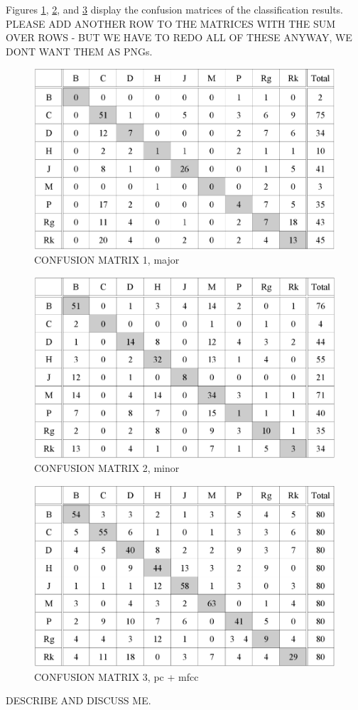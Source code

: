\documentclass{article}
\begin{document}
Figures \ref{fig:confMatMajPC}, \ref{fig:confMatMinPC}, and \ref{fig:confPC+MFCC} display the confusion matrices of the classification results. PLEASE ADD ANOTHER ROW TO THE MATRICES WITH THE SUM OVER ROWS - BUT WE HAVE TO REDO ALL OF THESE ANYWAY, WE DONT WANT THEM AS PNGs.
\begin{figure}[tb]
    \includegraphics[scale=.4]{graph/confMatMajPC}
	\caption{CONFUSION MATRIX 1, major}
	\label{fig:confMatMajPC}
\end{figure}
\begin{figure}[tb]
    \includegraphics[scale=.4]{graph/confMatMinPC}
	\caption{CONFUSION MATRIX 2, minor}
	\label{fig:confMatMinPC}
\end{figure}
\begin{figure}[tb]
    \includegraphics[scale=.4]{graph/confPC+MFCC}
	\caption{CONFUSION MATRIX 3, pc + mfcc}
	\label{fig:confPC+MFCC}
\end{figure}
DESCRIBE AND DISCUSS ME.
\end{document}
